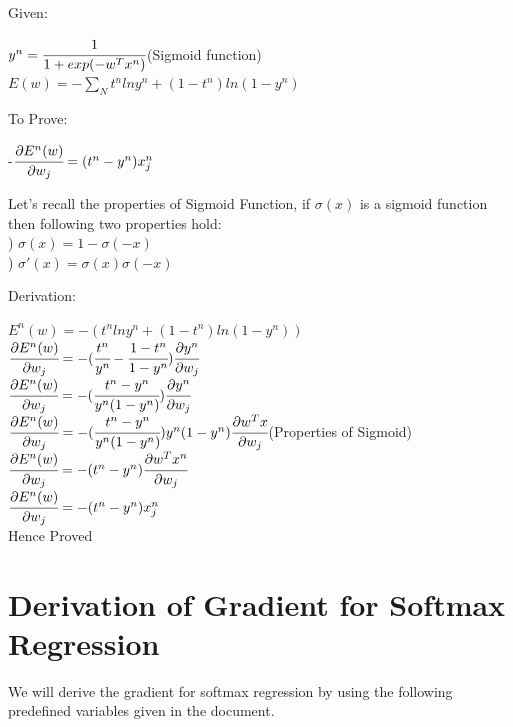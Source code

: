 \documentclass{article} %
\begin{document}
Given:
\begin{center}
	$y^n=\cfrac{1}{1+exp(-w^T x^n)}$(Sigmoid function)\\
    \hfill\break
    $E(w) = -\sum_N t^n lny^n + (1-t^n) ln(1-y^n)$\\
    \hfill\break
\end{center}
To Prove:
\begin{center}
    -$\cfrac{\partial E^n(w)}{\partial w_j} = (t^n-y^n)x^n_j $\\
    \hfill\break
\end{center}
\begin{center}
Let's recall the properties of Sigmoid Function, if $\sigma(x)$ is a sigmoid function then following two properties hold:\\
\hfill{}) $\sigma(x)=1-\sigma(-x)$\\
\hfill{}) $\sigma'(x)=\sigma(x)\sigma(-x)$\\
\hfill\break
\end{center}
Derivation:
\begin{center}
$E^n(w) = -(t^n lny^n + (1-t^n) ln(1-y^n))$\\
\hfill\break
\hfill\break
$\cfrac{\partial E^n(w)}{\partial w_j} = -(\cfrac{t^n}{y^n} - \cfrac{1-t^n}{1-y^n})\cfrac{\partial y^n}{\partial w_j}$\\
    \hfill\break
    \hfill\break
$\cfrac{\partial E^n(w)}{\partial w_j} = -(\cfrac{t^n-y^n}{y^n(1-y^n)})\cfrac{\partial y^n}{\partial w_j}$\\
    \hfill\break
    \hfill\break
$\cfrac{\partial E^n(w)}{\partial w_j} = -(\cfrac{t^n-y^n}{y^n(1-y^n)})y^n(1-y^n)\cfrac{\partial w^Tx}{\partial w_j}$(Properties of Sigmoid)\\
    \hfill\break
    \hfill\break
$\cfrac{\partial E^n(w)}{\partial w_j} = -(t^n-y^n)\cfrac{\partial w^Tx^n}{\partial w_j}$\\
    \hfill\break
    \hfill\break
$\cfrac{\partial E^n(w)}{\partial w_j} = -(t^n-y^n)x^n_j$\\
    \hfill\break
    Hence Proved 

\end{center}
\section{Derivation of Gradient for Softmax Regression}
We will derive the gradient for softmax regression by using the following predefined variables given in the document.
\end{document}
